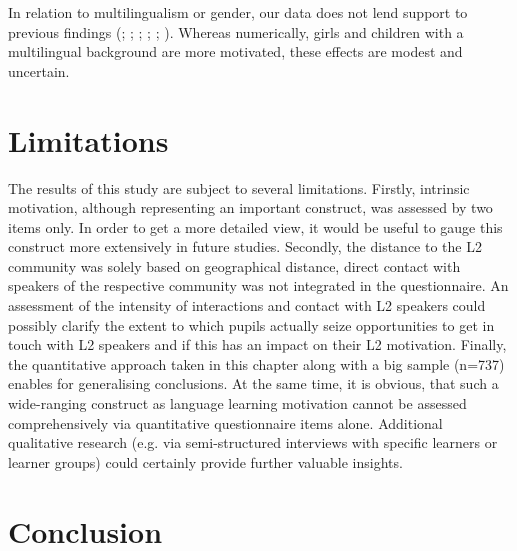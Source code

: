\documentclass[output=paper]{langsci/langscibook}
\begin{document}
In relation to multilingualism or gender, our data does not lend support to previous findings (\citealt{DoernyeiCsizer2002}; \citealt{Holder2005}; \citealt{Heinzmann2009,Heinzmann2010}; \citealt{BruehwilerLePapeRacine2017}; \citealt{Henry2009}; \citealt{CourtneyEtAl2017}). Whereas numerically, girls and children with a multilingual background are more motivated, these effects are modest and uncertain.

\section{Limitations}

The results of this study are subject to several limitations. Firstly, intrinsic motivation, although representing an important construct, was assessed by two items only. In order to get a more detailed view, it would be useful to gauge this construct more extensively in future studies. Secondly, the distance to the L2 community was solely based on geographical distance, direct contact with speakers of the respective community was not integrated in the questionnaire. An assessment of the intensity of interactions and contact with L2 speakers could possibly clarify the extent to which pupils actually seize opportunities to get in touch with L2 speakers and if this has an impact on their L2 motivation. Finally, the quantitative approach taken in this chapter along with a big sample (n=737) enables for generalising conclusions. At the same time, it is obvious, that such a wide-ranging construct as language learning motivation cannot be assessed comprehensively via quantitative questionnaire items alone. Additional qualitative research (e.g. via semi-structured interviews with specific learners or learner groups) could certainly provide further valuable insights.

\section{Conclusion}
\end{document}
